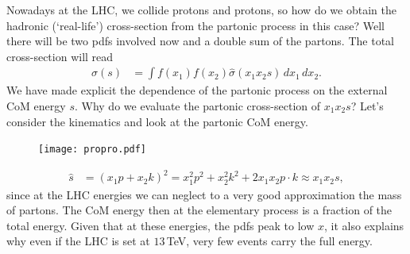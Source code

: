 \documentclass[relqm.tex]{subfiles}
\begin{document}
Nowadays at the LHC, we collide protons and protons, so how do we obtain the hadronic (`real-life') cross-section from the partonic process in this case?
Well there will be two pdfs involved now and a double sum of the partons. 
The total cross-section will read
\begin{align}
    \sigma(s) &= \int f(x_1)f(x_2)\hat{\sigma}(x_1x_2s)\,dx_1\,dx_2.
\end{align}
We have made explicit the dependence of the partonic process on the external CoM energy $s$.
Why do we evaluate the partonic cross-section of $x_1x_2s$?
Let's consider the kinematics and look at the partonic CoM energy. 
\begin{figure}[H]
    \centering
    \texttt{[image: propro.pdf]}
    \vspace{-30pt}
\end{figure}
\begin{align}
    \hat{s} &= (x_1p+x_2k)^2 = x_1^2p^2 + x_2^2k^2 + 2x_1x_2p\cdot k \approx x_1x_2s,
\end{align}
since at the LHC energies we can neglect to a very good approximation the mass of partons. 
The CoM energy then at the elementary process is a fraction of the total energy. 
Given that at these energies, the pdfs peak to low $x$, it also explains why even if the LHC is set at $13\,$TeV, very few events carry the full energy. 
\end{document}
